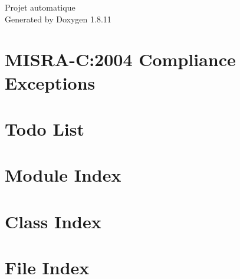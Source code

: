 \documentclass[twoside]{book}
\newcommand{\+}{\discretionary{\mbox{\scriptsize$\hookleftarrow$}}{}{}}
\newcommand{\clearemptydoublepage}{%
  \newpage{\pagestyle{empty}\cleardoublepage}%
}
\begin{document}
\hypersetup{pageanchor=false,
             bookmarksnumbered=true,
             pdfencoding=unicode
            }
\begin{titlepage}
\vspace*{7cm}
\begin{center}%
{\Large Projet automatique }\\
\vspace*{1cm}
{\large Generated by Doxygen 1.8.11}\\
\end{center}
\end{titlepage}
\clearemptydoublepage
\tableofcontents
\clearemptydoublepage
{}
\hypersetup{pageanchor=true}

\chapter{M\+I\+S\+R\+A-\/C\+:2004 Compliance Exceptions}
\label{CMSIS_MISRA_Exceptions}
\hypertarget{CMSIS_MISRA_Exceptions}{}

\chapter{Todo List}
\label{todo}
\hypertarget{todo}{}

\chapter{Module Index}

\chapter{Class Index}

\chapter{File Index}

\end{document}

